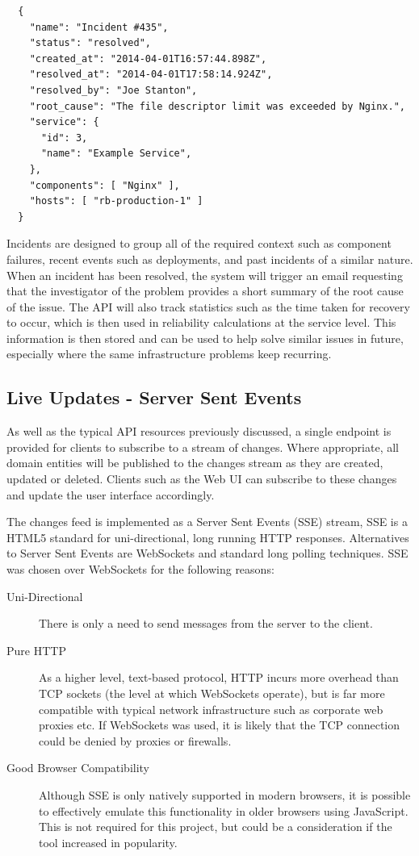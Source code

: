 \documentclass{cshonours}
\begin{document}
\begin{listing}[h]
\begin{verbatim}
  {
    "name": "Incident #435",
    "status": "resolved",
    "created_at": "2014-04-01T16:57:44.898Z",
    "resolved_at": "2014-04-01T17:58:14.924Z",
    "resolved_by": "Joe Stanton",
    "root_cause": "The file descriptor limit was exceeded by Nginx.",
    "service": {
      "id": 3,
      "name": "Example Service",
    },
    "components": [ "Nginx" ],
    "hosts": [ "rb-production-1" ]
  }
\end{verbatim}
\end{listing}

Incidents are designed to group all of the required context such as component failures, recent events such as deployments, and past incidents of a similar nature. When an incident has been resolved, the system will trigger an email requesting that the investigator of the problem provides a short summary of the root cause of the issue. The API will also track statistics such as the time taken for recovery to occur, which is then used in reliability calculations at the service level. This information is then stored and can be used to help solve similar issues in future, especially where the same infrastructure problems keep recurring.

\subsection{Live Updates - Server Sent Events}

As well as the typical API resources previously discussed, a single endpoint is provided for clients to subscribe to a stream of changes. Where appropriate, all domain entities will be published to the changes stream as they are created, updated or deleted. Clients such as the Web UI can subscribe to these changes and update the user interface accordingly.

The changes feed is implemented as a Server Sent Events (SSE) stream, SSE is a HTML5 standard for uni-directional, long running HTTP responses. Alternatives to Server Sent Events are WebSockets and standard long polling techniques. SSE was chosen over WebSockets for the following reasons:

\begin{description}
  \item[Uni-Directional] There is only a need to send messages from the server to the client.
  \item[Pure HTTP] As a higher level, text-based protocol, HTTP incurs more overhead than TCP sockets (the level at which WebSockets operate), but is far more compatible with typical network infrastructure such as corporate web proxies etc. If WebSockets was used, it is likely that the TCP connection could be denied by proxies or firewalls.
  \item[Good Browser Compatibility] Although SSE is only natively supported in modern browsers, it is possible to effectively emulate this functionality in older browsers using JavaScript. This is not required for this project, but could be a consideration if the tool increased in popularity.
\end{description}
\end{document}
